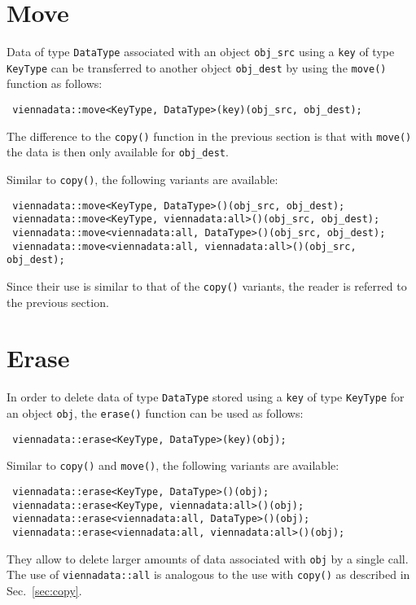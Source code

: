 

\section{Move}
Data of type \lstinline|DataType| associated with an object \lstinline|obj_src| using a \lstinline|key| of type \lstinline|KeyType| can be transferred to another object \lstinline|obj_dest| by using
the \lstinline|move()| function as follows:
\begin{lstlisting}
 viennadata::move<KeyType, DataType>(key)(obj_src, obj_dest);
\end{lstlisting}
The difference to the \lstinline|copy()| function in the previous section is that with \lstinline|move()| the data is then only available for \lstinline|obj_dest|.

Similar to \lstinline|copy()|, the following variants are available:
\begin{lstlisting}
 viennadata::move<KeyType, DataType>()(obj_src, obj_dest);
 viennadata::move<KeyType, viennadata:all>()(obj_src, obj_dest);
 viennadata::move<viennadata:all, DataType>()(obj_src, obj_dest);
 viennadata::move<viennadata:all, viennadata:all>()(obj_src, obj_dest);
\end{lstlisting}
Since their use is similar to that of the \lstinline|copy()| variants, the reader is referred to the previous section.


\section{Erase}
In order to delete data of type \lstinline|DataType| stored using a \lstinline|key| of type \lstinline|KeyType| for an object \lstinline|obj|,
the \lstinline|erase()| function can be used as follows:
\begin{lstlisting}
 viennadata::erase<KeyType, DataType>(key)(obj);
\end{lstlisting}
Similar to \lstinline|copy()| and \lstinline|move()|, the following variants are available:
\begin{lstlisting}
 viennadata::erase<KeyType, DataType>()(obj);
 viennadata::erase<KeyType, viennadata:all>()(obj);
 viennadata::erase<viennadata:all, DataType>()(obj);
 viennadata::erase<viennadata:all, viennadata:all>()(obj);
\end{lstlisting}
They allow to delete larger amounts of data associated with \lstinline|obj| by a single call.
The use of \lstinline|viennadata::all| is analogous to the use with \lstinline|copy()| as described in Sec.~\ref{sec:copy}.


